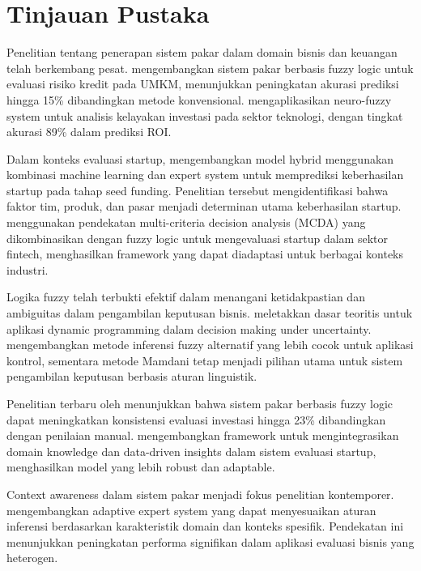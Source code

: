 \documentclass[12pt,a4paper]{article}
\begin{document}
\section{Tinjauan Pustaka}

Penelitian tentang penerapan sistem pakar dalam domain bisnis dan keuangan telah berkembang pesat. \citet{Kumar2023} mengembangkan sistem pakar berbasis fuzzy logic untuk evaluasi risiko kredit pada UMKM, menunjukkan peningkatan akurasi prediksi hingga 15\% dibandingkan metode konvensional. \citet{Zhang2022} mengaplikasikan neuro-fuzzy system untuk analisis kelayakan investasi pada sektor teknologi, dengan tingkat akurasi 89\% dalam prediksi ROI.

Dalam konteks evaluasi startup, \citet{Silva2023} mengembangkan model hybrid menggunakan kombinasi machine learning dan expert system untuk memprediksi keberhasilan startup pada tahap seed funding. Penelitian tersebut mengidentifikasi bahwa faktor tim, produk, dan pasar menjadi determinan utama keberhasilan startup. \citet{Anderson2022} menggunakan pendekatan multi-criteria decision analysis (MCDA) yang dikombinasikan dengan fuzzy logic untuk mengevaluasi startup dalam sektor fintech, menghasilkan framework yang dapat diadaptasi untuk berbagai konteks industri.

Logika fuzzy telah terbukti efektif dalam menangani ketidakpastian dan ambiguitas dalam pengambilan keputusan bisnis. \citet{Bellman1970} meletakkan dasar teoritis untuk aplikasi dynamic programming dalam decision making under uncertainty. \citet{Sugeno1985} mengembangkan metode inferensi fuzzy alternatif yang lebih cocok untuk aplikasi kontrol, sementara metode Mamdani tetap menjadi pilihan utama untuk sistem pengambilan keputusan berbasis aturan linguistik.

Penelitian terbaru oleh \citet{Wang2023} menunjukkan bahwa sistem pakar berbasis fuzzy logic dapat meningkatkan konsistensi evaluasi investasi hingga 23\% dibandingkan dengan penilaian manual. \citet{Lopez2022} mengembangkan framework untuk mengintegrasikan domain knowledge dan data-driven insights dalam sistem evaluasi startup, menghasilkan model yang lebih robust dan adaptable.

Context awareness dalam sistem pakar menjadi fokus penelitian kontemporer. \citet{Chen2023} mengembangkan adaptive expert system yang dapat menyesuaikan aturan inferensi berdasarkan karakteristik domain dan konteks spesifik. Pendekatan ini menunjukkan peningkatan performa signifikan dalam aplikasi evaluasi bisnis yang heterogen.
\end{document}

